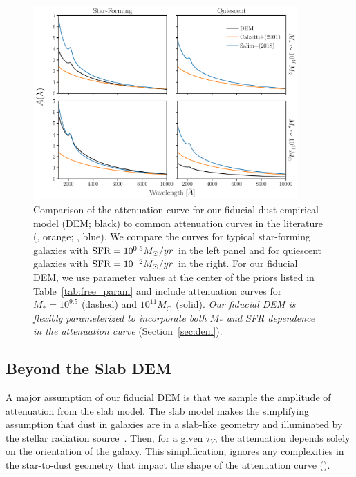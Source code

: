 \begin{figure}
\begin{center}
    \includegraphics[width=0.9\textwidth]{figs/dems.pdf}
    \caption{Comparison of the attenuation curve for our fiducial dust empirical
    model (DEM; black) to common attenuation curves in the
    literature (\citealt{calzetti2001}, orange; \citealt{salim2018}, blue). We compare the curves for typical 
    star-forming galaxies with ${\rm SFR}=10^{0.5}M_\odot/yr$ in the left panel
    and for quiescent galaxies with ${\rm SFR}=10^{-2}M_\odot/yr$ in the right.
    For our fiducial DEM, we use parameter values at {\color{red} the center of the priors
    listed in Table~\ref{tab:free_param}} and include attenuation curves for $M_* = 10^{9.5}$
    (dashed) and $10^{11} M_\odot$ (solid). {\em Our fiducial DEM is flexibly
    parameterized to incorporate both $M_*$ and SFR dependence in the
    attenuation curve} (Section~\ref{sec:dem}).
    } 
\label{fig:dem}
\end{center}
\end{figure}


\subsection{Beyond the Slab DEM}  \label{sec:nonslab} 
A major assumption of our fiducial DEM is that we sample the amplitude of
attenuation from the slab model. The slab model makes the simplifying assumption 
that dust in galaxies are in a slab-like geometry and illuminated by the
stellar radiation source~\citep{somerville1999}. Then, for a given $\tau_V$,
the attenuation depends solely on the orientation of the galaxy. This
simplification, ignores any complexities in the star-to-dust geometry that
impact the shape of the attenuation curve (). 

